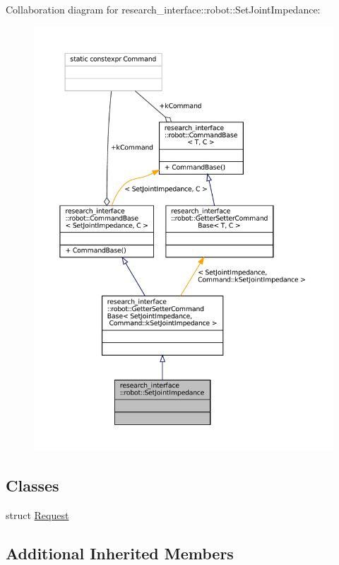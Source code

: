 Collaboration diagram for research\+\_\+interface\+:\+:robot\+:\+:Set\+Joint\+Impedance\+:
\nopagebreak
\begin{figure}[H]
\begin{center}
\leavevmode
\includegraphics[width=350pt]{structresearch__interface_1_1robot_1_1SetJointImpedance__coll__graph}
\end{center}
\end{figure}
\subsection*{Classes}
\begin{DoxyCompactItemize}
\item 
struct \hyperlink{structresearch__interface_1_1robot_1_1SetJointImpedance_1_1Request}{Request}
\end{DoxyCompactItemize}
\subsection*{Additional Inherited Members}


